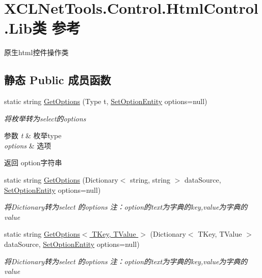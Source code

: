 \hypertarget{class_x_c_l_net_tools_1_1_control_1_1_html_control_1_1_lib}{\section{X\-C\-L\-Net\-Tools.\-Control.\-Html\-Control.\-Lib类 参考}
\label{class_x_c_l_net_tools_1_1_control_1_1_html_control_1_1_lib}
}


原生html控件操作类  


\subsection*{静态 Public 成员函数}
\begin{DoxyCompactItemize}
\item 
static string \hyperlink{class_x_c_l_net_tools_1_1_control_1_1_html_control_1_1_lib_a6bc535ff27a3e67b2c4dac1d5e99aa8c}{Get\-Options} (Type t, \hyperlink{class_x_c_l_net_tools_1_1_entity_1_1_set_option_entity}{Set\-Option\-Entity} options=null)
\begin{DoxyCompactList}\small\item\em 将枚举转为select的options 
\begin{DoxyParams}{参数}
{\em t} & 枚举type\\
\hline
{\em options} & 选项\\
\hline
\end{DoxyParams}
\begin{DoxyReturn}{返回}
option字符串
\end{DoxyReturn}
\end{DoxyCompactList}\item 
static string \hyperlink{class_x_c_l_net_tools_1_1_control_1_1_html_control_1_1_lib_aea5ab0601c97a418ef6291f75aa7baff}{Get\-Options} (Dictionary$<$ string, string $>$ data\-Source, \hyperlink{class_x_c_l_net_tools_1_1_entity_1_1_set_option_entity}{Set\-Option\-Entity} options=null)
\begin{DoxyCompactList}\small\item\em 将\-Dictionary转为select 的options 注：option的text为字典的key,value为字典的value \end{DoxyCompactList}\item 
static string \hyperlink{class_x_c_l_net_tools_1_1_control_1_1_html_control_1_1_lib_a48013321b30150acdbf3fcf28955980e}{Get\-Options$<$ T\-Key, T\-Value $>$} (Dictionary$<$ T\-Key, T\-Value $>$ data\-Source, \hyperlink{class_x_c_l_net_tools_1_1_entity_1_1_set_option_entity}{Set\-Option\-Entity} options=null)
\begin{DoxyCompactList}\small\item\em 将\-Dictionary转为select 的options 注：option的text为字典的key,value为字典的value \end{DoxyCompactList}\end{DoxyCompactItemize}


